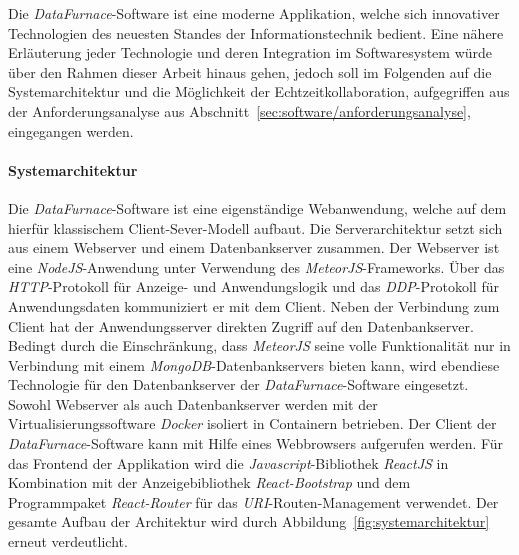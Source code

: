 \documentclass[
  language=german, %
  type=bachelor,%
  ngerman
]{isthesis}
\begin{document}
\begin{content}

  Die \textit{DataFurnace}-Software ist eine moderne Applikation, welche sich
  innovativer Technologien des neuesten Standes der Informationstechnik
  bedient. Eine nähere Erläuterung jeder Technologie und deren Integration im
  Softwaresystem würde über den Rahmen dieser Arbeit hinaus gehen, jedoch soll
  im Folgenden auf die Systemarchitektur und die Möglichkeit der
  Echtzeitkollaboration, aufgegriffen aus der Anforderungsanalyse aus
  Abschnitt~\ref{sec:software/anforderungsanalyse}, eingegangen werden.

  \paragraph{Systemarchitektur}
  Die \textit{DataFurnace}-Software ist eine eigenständige  Webanwendung,
  welche auf dem hierfür klassischem Client-Sever-Modell aufbaut. Die
  Serverarchitektur setzt sich aus einem Webserver und einem Datenbankserver
  zusammen. Der Webserver ist eine \textit{NodeJS}-Anwendung unter Verwendung
  des \textit{MeteorJS}-Frameworks. Über das \textit{HTTP}-Protokoll für
  Anzeige- und Anwendungslogik und das \textit{DDP}-Protokoll für
  Anwendungsdaten kommuniziert er mit dem Client. Neben der Verbindung zum
  Client hat der Anwendungsserver direkten Zugriff auf den Datenbankserver.
  Bedingt durch die Einschränkung, dass \textit{MeteorJS} seine volle
  Funktionalität nur in Verbindung mit einem \textit{MongoDB}-Datenbankservers
  bieten kann, wird ebendiese Technologie für den Datenbankserver der
  \textit{DataFurnace}-Software eingesetzt. Sowohl Webserver als auch
  Datenbankserver werden mit der Virtualisierungssoftware \textit{Docker}
  isoliert in Containern betrieben.  Der Client der
  \textit{DataFurnace}-Software kann mit Hilfe eines Webbrowsers aufgerufen
  werden. Für das Frontend der Applikation wird die
  \textit{Javascript}-Bibliothek \textit{ReactJS} in Kombination mit der
  Anzeigebibliothek \textit{React-Bootstrap} und dem Programmpaket
  \textit{React-Router} für das \textit{URI}-Routen-Management verwendet.  Der
  gesamte Aufbau der Architektur wird durch
  Abbildung~\ref{fig:systemarchitektur} erneut verdeutlicht.

  \begin{figure}
		\footnotesize
\end{figure}
\end{content}
\end{document}
